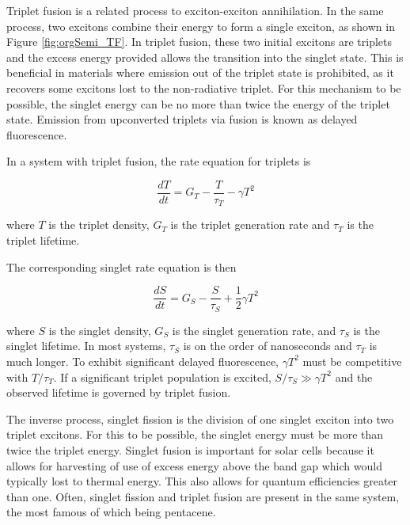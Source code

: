 \documentclass[../thesis.tex]{subfiles}
\begin{document}
Triplet fusion is a related process to exciton-exciton annihilation.
In the same process, two excitons combine their energy to form a single exciton, as shown in Figure \ref{fig:orgSemi_TF}.
In triplet fusion, these two initial excitons are triplets and the excess energy provided allows the transition into the singlet state.  
This is beneficial in materials where emission out of the triplet state is prohibited, as it recovers some excitons lost to the non-radiative triplet.
For this mechanism to be possible, the singlet energy can be no more than twice the energy of the triplet state.
Emission from upconverted triplets via fusion is known as delayed fluorescence.

In a system with triplet fusion, the rate equation for triplets is\supercite{Ryasnyanskiy2011}

\begin{equation}
\frac{dT}{dt}=G_T-\frac{T}{\tau_T}-\gamma T^2
    \label{eqn:triplet_fusion}
\end{equation}

where $T$ is the triplet density, $G_T$ is the triplet generation rate and $\tau_T$ is the triplet lifetime.

The corresponding singlet rate equation is then 

\begin{equation}
\frac{dS}{dt}=G_S-\frac{S}{\tau_S}+\frac{1}{2}\gamma T^2
    \label{eqn:triplet_fusion_singlet}
\end{equation}


where $S$ is the singlet density, $G_S$ is the singlet generation rate, and $\tau_S$ is the singlet lifetime.
In most systems, $\tau_S$ is on the order of nanoseconds and $\tau_T$ is much longer.  
To exhibit significant delayed fluorescence, $\gamma T^2$ must be competitive with $T/\tau_T$.
If a significant triplet population is excited, $S/\tau_S\gg \gamma T^2$ and the observed lifetime is governed by triplet fusion.  


The inverse process, singlet fission is the division of one singlet exciton into two triplet excitons.\supercite{Congreve2013,Smith2010,Lee2013a}
For this to be possible, the singlet energy must be more than twice the triplet energy.  
Singlet fusion is important for solar cells because it allows for harvesting of use of excess energy above the band gap which would typically lost to thermal energy.  
This also allows for quantum efficiencies greater than one.
Often, singlet fission and triplet fusion are present in the same system, the most famous of which being pentacene.\supercite{Ryasnyanskiy2011}
\end{document}
